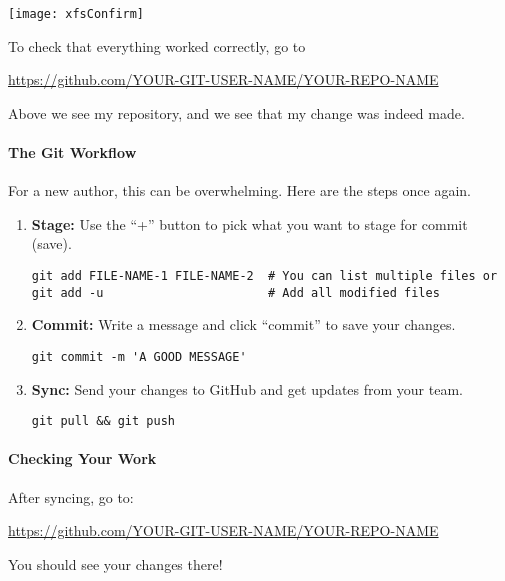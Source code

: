 \documentclass{ximera}
\begin{document}
\newpage

\begin{image}
    \texttt{[image: xfsConfirm]}
\end{image}
To check that everything worked correctly, go to
\begin{center}
    \url{https://github.com/YOUR-GIT-USER-NAME/YOUR-REPO-NAME}
\end{center}
Above we see my repository, and we see that my change was indeed made.


\paragraph{The Git Workflow}

For a new author, this can be overwhelming. Here are the steps once again.
\begin{enumerate}
    \item \textbf{Stage:} Use the ``+'' button to pick what you want to
          stage for commit (save).
\begin{verbatim}
git add FILE-NAME-1 FILE-NAME-2  # You can list multiple files or
git add -u                       # Add all modified files 
\end{verbatim}
    \item \textbf{Commit:} Write a message and click ``commit'' to save
          your
          changes.
\begin{verbatim}
git commit -m 'A GOOD MESSAGE'
\end{verbatim}
    \item \textbf{Sync:} Send your changes to GitHub and get updates from
          your
          team.
\begin{verbatim}
git pull && git push
\end{verbatim}
\end{enumerate}

\paragraph{Checking Your Work}

After syncing, go to:
\begin{center}
    \url{https://github.com/YOUR-GIT-USER-NAME/YOUR-REPO-NAME}
\end{center}
You should see your changes there!
\pdfOnly{\end{multicols}}



\twocolumn
\end{document}
